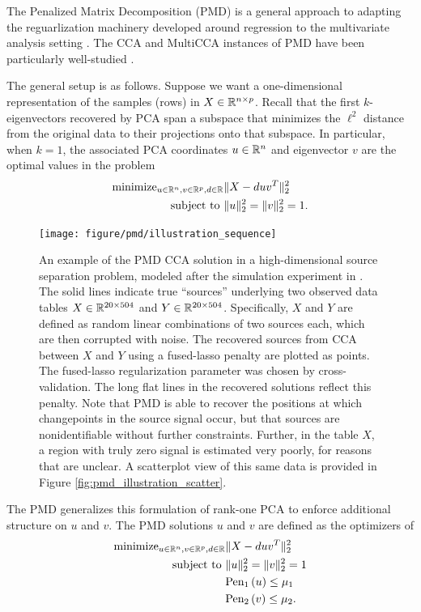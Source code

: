 \documentclass[14pt]{extarticle}
\begin{document}
The Penalized Matrix Decomposition (PMD) is a general approach to adapting the
reguarlization machinery developed around regression to the multivariate
analysis setting \citep{witten2009penalized}. The CCA and MultiCCA instances of
PMD have been particularly well-studied \citep{witten2009penalized,
  witten2013package}.

The general setup is as follows. Suppose we want a one-dimensional
representation of the samples (rows) in $X \in \mathbb{R}^{n \times p}$. Recall that
the first $k$-eigenvectors recovered by PCA span a subspace that minimizes the
$\ell^{2}$ distance from the original data to their projections onto that
subspace. In particular, when $k = 1$, the associated PCA coordinates $u \in
\mathbb{R}^{n}$ and eigenvector $v$ are the optimal values in the problem
\begin{align*}
  \text{minimize}_{u \in \mathbb{R}^{n}, v \in \mathbb{R}^{p}, d \in \mathbb{R}} &\|X - duv^{T}\|_{2}^{2} \\
  \text{subject to } &\|u\|_{2}^{2} = \|v\|_{2}^{2} = 1.
\end{align*}

\begin{figure}
  \centering
  \texttt{[image: figure/pmd/illustration\_sequence]}
  \caption{An example of the PMD CCA solution in a high-dimensional source
    separation problem, modeled after the simulation experiment in
    \citep{witten2009penalized}. The solid lines indicate true ``sources''
    underlying two observed data tables $X \in \mathbb{R}^{20 \times 504}$ and $Y
    \in \mathbb{R}^{20 \times 504}$. Specifically, $X$ and $Y$ are defined as random
    linear combinations of two sources each, which are then corrupted with
    noise. The recovered sources from CCA between $X$ and $Y$ using a
    fused-lasso penalty are plotted as points. The fused-lasso regularization
    parameter was chosen by cross-validation. The long flat lines in the
    recovered solutions reflect this penalty. Note that PMD is able to recover
    the positions at which changepoints in the source signal occur, but that
    sources are nonidentifiable without further constraints. Further, in the
    table $X$, a region with truly zero signal is estimated very poorly, for
    reasons that are unclear. A scatterplot view of this same data is provided
    in Figure
    \ref{fig:pmd_illustration_scatter}. \label{fig:pmd_illustration_sequence}}
\end{figure}

The PMD generalizes this formulation of rank-one PCA to enforce additional
structure on $u$ and $v$. The PMD solutions $u$ and $v$ are defined as the
optimizers of
\begin{align}
\label{eq:pmd_opt} \text{minimize}_{u \in \mathbb{R}^{n}, v \in \mathbb{R}^{p}, d
  \in \mathbb{R}} &\|X - duv^{T}\|_{2}^{2} \\
  \text{subject to } &\|u\|_{2}^{2} = \|v\|_{2}^{2} = 1 \nonumber \\
  & \text{Pen}_{1}\left(u\right) \leq \mu_{1} \nonumber \\
  & \text{Pen}_{2}\left(v\right) \leq \mu_{2}. \nonumber
\end{align}
\end{document}
